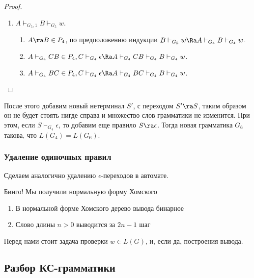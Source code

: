 \begin{proof}
\begin{enumerate}
\begin{enumerate}
\begin{enumerate}
                \item \(A \vdash_{G_5, 1} B \vdash_{G_5} w\).
                \begin{enumerate}
                    \item \(A \ra B \in P_4\), по предположению индукции \(B \vdash_{G_5} w \Ra A \vdash_{G_4} B \vdash_{G_4} w\).
                    
                    \item \(A \vdash_{G_4} CB \in P_4, C \vdash_{G_4} \epsilon \Ra A \vdash_{G_4} CB \vdash_{G_4} B \vdash_{G_4} w\).
                    
                    \item \(A \vdash_{G_4} BC \in P_4, C \vdash_{G_4} \epsilon \Ra A \vdash_{G_4} BC \vdash_{G_4} B \vdash_{G_4} w\).
                \end{enumerate}
            \end{enumerate}
        \end{enumerate}
    \end{enumerate}
\end{proof}

После этого добавим новый нетерминал \(S'\), с переходом \(S' \ra S\), таким образом он не будет стоять нигде справа и множество слов грамматики не изменится. При этом, если \(S \vdash_{G_4} \epsilon\), то добавим еще правило \(S \ra \epsilon\). Тогда новая грамматика \(G_6\) такова, что \(L(G_4) = L(G_6)\).

\subsubsection{Удаление одиночных правил}
Сделаем аналогично удалению \(\epsilon\)-переходов в автомате.

Бинго! Мы получили нормальную форму Хомского

\begin{corollary}\indent
    \begin{enumerate}
        \item В нормальной форме Хомского дерево вывода бинарное
        \item Слово длины \(n > 0\) выводится за \(2n - 1\) шаг
    \end{enumerate}
\end{corollary}

Перед нами стоит задача проверки \(w \in L(G)\), и, если да, построения вывода.

\subsection{Разбор КС-грамматики}
